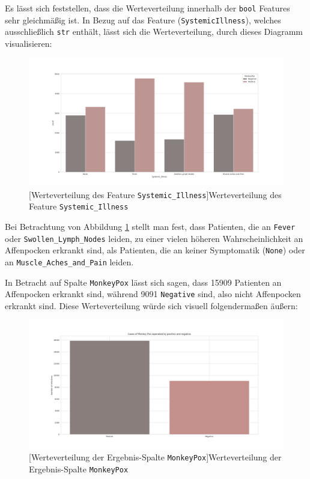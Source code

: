 \documentclass[13pt,a4paper, listof=entryprefix, bibliography=totocnumbered,toc=listofnumbered,lof=listofnumbered]{scrartcl}
\begin{document}
	Es lässt sich feststellen, dass die Werteverteilung innerhalb der \lstinline{bool} Features sehr gleichmäßig ist. 
	In Bezug auf das Feature (\lstinline{SystemicIllness}), welches ausschließlich \lstinline{str} enthält,  lässt sich die 
	Werteverteilung, durch dieses Diagramm visualisieren: 

	\begin{figure}[H]
		\centering
		\includegraphics[width=0.8\linewidth]{Bilder/systemic_illness_plot.png}
		[Werteverteilung des Feature \lstinline{Systemic_Illness}]{Werteverteilung des Feature \lstinline{Systemic_Illness}}
		\label{fig:systemic_illness_plot}
	\end{figure}

	Bei Betrachtung von Abbildung \ref{fig:systemic_illness_plot} stellt man fest, dass Patienten, die an \lstinline{Fever} oder \lstinline{Swollen_Lymph_Nodes} leiden, zu einer
	vielen höheren Wahrscheinlichkeit an Affenpocken erkrankt sind, als Patienten, die an keiner Symptomatik (\lstinline{None}) oder an \lstinline{Muscle_Aches_and_Pain} leiden.

	In Betracht auf Spalte \lstinline{MonkeyPox} lässt sich sagen, dass 15909 Patienten an Affenpocken erkrankt sind, während 9091 \lstinline{Negative} sind,
	also nicht Affenpocken erkrankt sind. Diese Werteverteilung würde sich visuell folgendermaßen äußern:

	\begin{figure}[H]
		\centering
		\includegraphics[width=0.8\linewidth]{Bilder/monkey_pox_plot.png}
		[Werteverteilung der Ergebnis-Spalte \lstinline{MonkeyPox}]{Werteverteilung der Ergebnis-Spalte \lstinline{MonkeyPox}}
		\label{fig:monkey_pox_plot}
	\end{figure}
\end{document}
